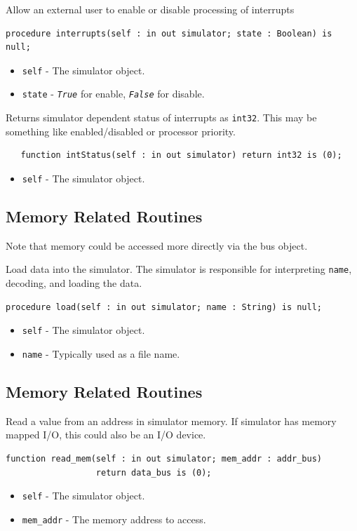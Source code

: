 \documentclass[10pt, openany]{book}
\newcommand{\constant}[1]{\emph{\texttt{#1}}}
\newcommand{\keyword}[1]{\texttt{#1}}
\newcommand{\datatype}[1]{\texttt{#1}}
\begin{document}
Allow an external user to enable or disable processing of interrupts
\begin{lstlisting}
procedure interrupts(self : in out simulator; state : Boolean) is null;
\end{lstlisting}
\begin{itemize}
  \item \keyword{self} - The simulator object.
  \item \keyword{state} - \constant{True} for enable, \constant{False} for disable.
\end{itemize}

Returns simulator dependent status of interrupts as \datatype{int32}.
This may be something like enabled/disabled or processor priority.
\begin{lstlisting}
   function intStatus(self : in out simulator) return int32 is (0);
\end{lstlisting}
\begin{itemize}
  \item \keyword{self} - The simulator object.
\end{itemize}

\subsection{Memory Related Routines}

Note that memory could be accessed more directly via the bus object.

Load data into the simulator.
The simulator is responsible for interpreting \keyword{name}, decoding, and loading the data.
\begin{lstlisting}
procedure load(self : in out simulator; name : String) is null;
\end{lstlisting}
\begin{itemize}
  \item \keyword{self} - The simulator object.
  \item \keyword{name} - Typically used as a file name.
\end{itemize}
\subsection{Memory Related Routines}

Read a value from an address in simulator memory.
If simulator has memory mapped I/O, this could also be an I/O device.
\begin{lstlisting}
function read_mem(self : in out simulator; mem_addr : addr_bus)
                  return data_bus is (0);
\end{lstlisting}
\begin{itemize}
  \item \keyword{self} - The simulator object.
  \item \keyword{mem\_addr} - The memory address to access.
\end{itemize}
\end{document}
